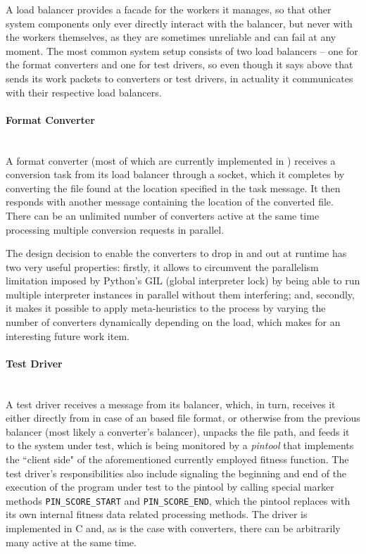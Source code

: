   A load balancer provides a facade for the workers it manages, so that other system components only ever
  directly interact with the balancer, but never with the workers themselves, as they are sometimes unreliable
  and can fail at any moment. The most common system setup consists of two load balancers -- one for the format
  converters and one for test drivers, so even though it says above that \xmlmate sends its work packets to
  converters or test drivers, in actuality it communicates with their respective load balancers. 
  \paragraph{Format Converter} ~\\
  A format converter (most of which are currently implemented in \python) receives a conversion task from
  its load balancer through a \zmq socket, which it completes by converting the file found at the location
  specified in the task message. It then responds with another message containing the location of the converted
  file. There can be an unlimited number of converters active at the same time processing multiple
  conversion requests in parallel. 
  
  The design decision to enable the converters to drop in and out at
  runtime has two very useful properties: firstly, it allows to circumvent the parallelism limitation
  imposed by {\small Python's} GIL (global interpreter lock) by being able to run multiple interpreter
  instances in parallel without them interfering; and, secondly, it makes it possible to apply meta-heuristics
  to the process by varying the number of converters dynamically depending on the load, which makes for an
  interesting future work item.
  \paragraph{Test Driver} ~\\
  A test driver receives a message from its balancer, which, in turn, receives it either directly from
  \xmlmate in case of an \xml based file format, or otherwise from the previous balancer (most likely a 
  converter's balancer), unpacks the file path, and feeds it to the system under test, which is being monitored
  by a \emph{pintool} that implements the ``client side" of the aforementioned currently employed fitness
  function. The test driver's responsibilities also include signaling the beginning and end of the execution of
  the program under test to the pintool by calling special marker methods \texttt{PIN\_SCORE\_START}
  and \texttt{PIN\_SCORE\_END}, which the pintool replaces with its own internal fitness data related
  processing methods. The driver is implemented in {\small C} and, as is the case with converters, there can
  be arbitrarily many active at the same time.

